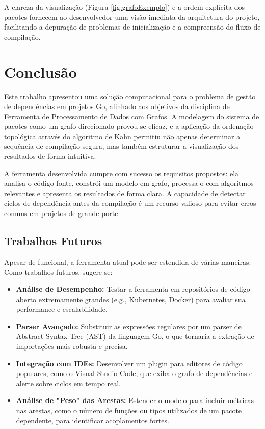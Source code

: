 \documentclass[12pt]{article}
\begin{document}
A clareza da visualização (Figura \ref{fig:grafoExemplo}) e a ordem explícita dos pacotes fornecem ao desenvolvedor uma visão imediata da arquitetura do projeto, facilitando a depuração de problemas de inicialização e a compreensão do fluxo de compilação.

\section{Conclusão}

Este trabalho apresentou uma solução computacional para o problema de gestão de dependências em projetos Go, alinhado aos objetivos da disciplina de Ferramenta de Processamento de Dados com Grafos. A modelagem do sistema de pacotes como um grafo direcionado provou-se eficaz, e a aplicação da ordenação topológica através do algoritmo de Kahn \cite{kahn1962} permitiu não apenas determinar a sequência de compilação segura, mas também estruturar a visualização dos resultados de forma intuitiva.

A ferramenta desenvolvida cumpre com sucesso os requisitos propostos: ela analisa o código-fonte, constrói um modelo em grafo, processa-o com algoritmos relevantes e apresenta os resultados de forma clara. A capacidade de detectar ciclos de dependência antes da compilação é um recurso valioso para evitar erros comuns em projetos de grande porte.

\subsection{Trabalhos Futuros}
Apesar de funcional, a ferramenta atual pode ser estendida de várias maneiras. Como trabalhos futuros, sugere-se:
\begin{itemize}
    \item \textbf{Análise de Desempenho:} Testar a ferramenta em repositórios de código aberto extremamente grandes (e.g., Kubernetes, Docker) para avaliar sua performance e escalabilidade.
    \item \textbf{Parser Avançado:} Substituir as expressões regulares por um parser de Abstract Syntax Tree (AST) da linguagem Go, o que tornaria a extração de importações mais robusta e precisa.
    \item \textbf{Integração com IDEs:} Desenvolver um plugin para editores de código populares, como o Visual Studio Code, que exiba o grafo de dependências e alerte sobre ciclos em tempo real.
    \item \textbf{Análise de "Peso" das Arestas:} Estender o modelo para incluir métricas nas arestas, como o número de funções ou tipos utilizados de um pacote dependente, para identificar acoplamentos fortes.
\end{itemize}



\end{document}
